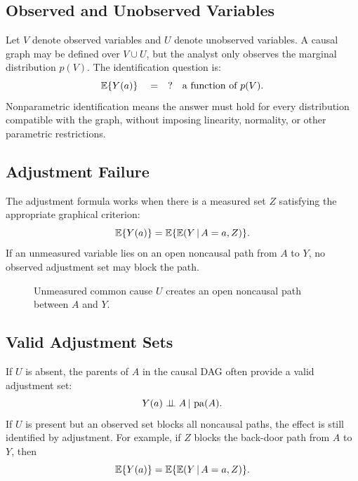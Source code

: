\label{lec:9-6}

\subsection{Observed and Unobserved Variables}

Let $V$ denote observed variables and $U$ denote unobserved variables. A causal
graph may be defined over $V\cup U$, but the analyst only observes the marginal
distribution $p(V)$. The identification question is:
\[
  \mathbb{E}\{Y(a)\}\quad =\quad ?\quad \text{a function of }p(V).
\]
Nonparametric identification means the answer must hold for every distribution
compatible with the graph, without imposing linearity, normality, or other
parametric restrictions.

\subsection{Adjustment Failure}

The adjustment formula works when there is a measured set $Z$ satisfying the
appropriate graphical criterion:
\[
  \mathbb{E}\{Y(a)\}=\mathbb{E}\{\mathbb{E}(Y\,\vert\, A=a,Z)\}.
\]
If an unmeasured variable lies on an open noncausal path from $A$ to $Y$, no
observed adjustment set may block the path.

\begin{figure}[H]
\centering
{}
\caption{Unmeasured common cause $U$ creates an open noncausal path between $A$ and $Y$.}
\label{fig:ch9-unmeasured-confounding}
\end{figure}

\subsection{Valid Adjustment Sets}

If $U$ is absent, the parents of $A$ in the causal DAG often provide a valid
adjustment set:
\[
  Y(a)\perp\!\!\!\perp A\,\vert\, \operatorname{pa}(A).
\]
If $U$ is present but an observed set blocks all noncausal paths, the effect is
still identified by adjustment. For example, if $Z$ blocks the back-door path
from $A$ to $Y$, then
\[
  \mathbb{E}\{Y(a)\}=\mathbb{E}\{\mathbb{E}(Y\,\vert\, A=a,Z)\}.
\]

